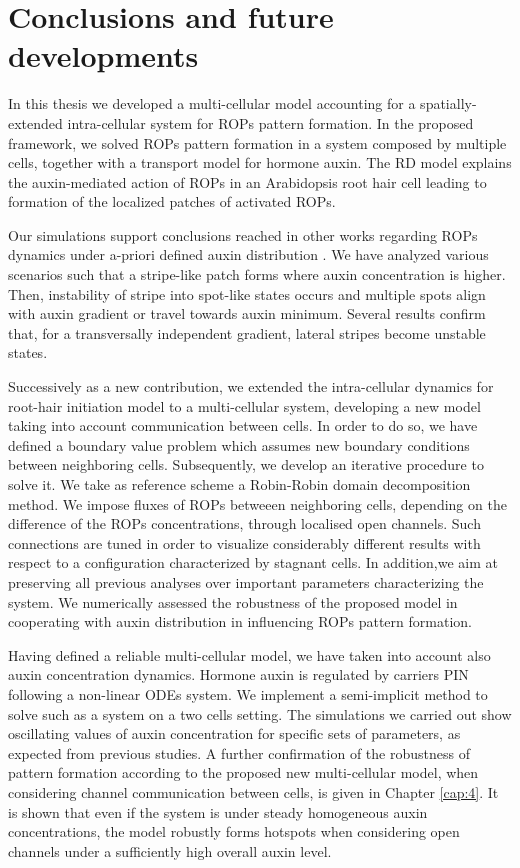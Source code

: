 \chapter{Conclusions and future developments}%
\label{ch:conclusions}
In this thesis we developed a multi-cellular model accounting for a spatially-extended intra-cellular system for ROPs pattern formation. In the proposed framework, we solved ROPs pattern formation in a system composed by multiple cells, together with a transport model for hormone auxin. The RD model explains the auxin-mediated action of ROPs in an Arabidopsis root hair cell leading to formation of the localized patches of activated ROPs.

Our simulations support conclusions reached in other works regarding ROPs dynamics under a-priori defined auxin distribution \cite{phdthesis:victor, intra1_R, intra2}. We have analyzed various scenarios such that a stripe-like patch forms where auxin concentration is higher. Then, instability of stripe into spot-like states occurs and multiple spots align with auxin gradient or travel towards auxin minimum. Several results confirm that, for a transversally independent gradient, lateral stripes become unstable states.

Successively as a new contribution, we extended the intra-cellular dynamics for root-hair initiation model to a multi-cellular system, developing a new model taking into account communication between cells. In order to do so, we have defined a boundary value problem which assumes new boundary conditions between neighboring cells. Subsequently, we develop an iterative procedure to solve it. We take as reference scheme a Robin-Robin domain decomposition method. We impose fluxes of ROPs betweeen neighboring cells, depending on the difference of the ROPs concentrations, through localised open channels. Such connections are tuned in order to visualize considerably different results with respect to a configuration characterized by stagnant cells. In addition,we aim at preserving all previous analyses over important parameters characterizing the system. We numerically assessed the robustness of the proposed model in cooperating with auxin distribution in influencing ROPs pattern formation.

Having defined a reliable multi-cellular model, we have taken into account also auxin concentration dynamics. Hormone auxin is regulated by carriers PIN following a non-linear ODEs system. We implement a semi-implicit method to solve such as a system on a two cells setting. The simulations we carried out show oscillating values of auxin concentration for specific sets of parameters, as expected from previous studies. A further confirmation of the robustness of pattern formation according to the proposed new multi-cellular model, when considering channel communication between cells, is given in Chapter \ref{cap:4}. It is shown that even if the system is under steady homogeneous auxin concentrations, the model robustly forms hotspots when considering open channels under a sufficiently high overall auxin level.

